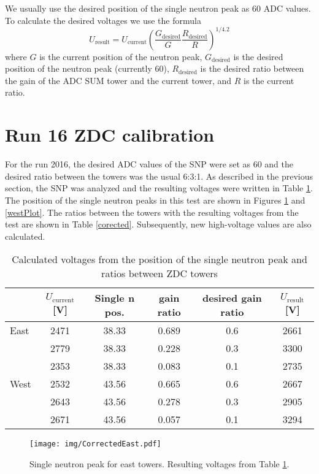 We usually use the desired position of the single neutron peak as 60 ADC values. To calculate
the desired voltages we use the formula
\begin{equation}
U_{\text{result}} = U_\text{current}\left(\frac{G_\text{desired}}{G} 
\frac{R_\text{desired}}{R}\right)^{1/4.2}
\end{equation}
where $G$ is the current position of the neutron peak, $G_\text{desired}$ is the desired position
of the neutron peak (currently 60), $R_\text{desired}$ is the desired ratio between the gain of the ADC SUM
tower and the current tower, and $R$ is the current ratio.

\section{Run 16 ZDC calibration}
For the run 2016, the desired ADC values of the SNP were set as 60 and the desired ratio between the
towers was the usual 6:3:1. As described in the previous section, the SNP was analyzed
and the resulting voltages were written in Table \ref{uncorected}. The position of the single
neutron peaks in this test
are shown in Figures \ref{eastPlot} and \ref{westPlot}.
The ratios between the towers with the resulting voltages from the test
are shown in Table \ref{corected}.
Subsequently, new high-voltage values are also calculated.

\begin{table}[htb] 
\caption{Calculated voltages from the position of the single neutron peak and ratios 
between ZDC towers}
\label{uncorected}
\begin{center}
\begin{tabular}{lccccc}
 \toprule
 &$U_\text{current}$[V]&Single n pos.&gain ratio&desired gain ratio&$U_\text{result}$[V]\\
\midrule
 East&2471&38.33&0.689&0.6&2661\\
     &2779&38.33&0.228&0.3&3300\\
     &2353&38.33&0.083&0.1&2735\\
 \midrule
West&2532&43.56&0.665&0.6&2667\\
    &2643&43.56&0.278&0.3&2905\\
    &2671&43.56&0.057&0.1&3294\\
 \bottomrule
\end{tabular}
\end{center}
\end{table}

\begin{figure}[htb]
\begin{center}
\texttt{[image: img/CorrectedEast.pdf]}
\end{center}
\caption{Single neutron peak for east towers. Resulting voltages from Table \ref{uncorected}.}
\label{eastPlot}
\end{figure}

